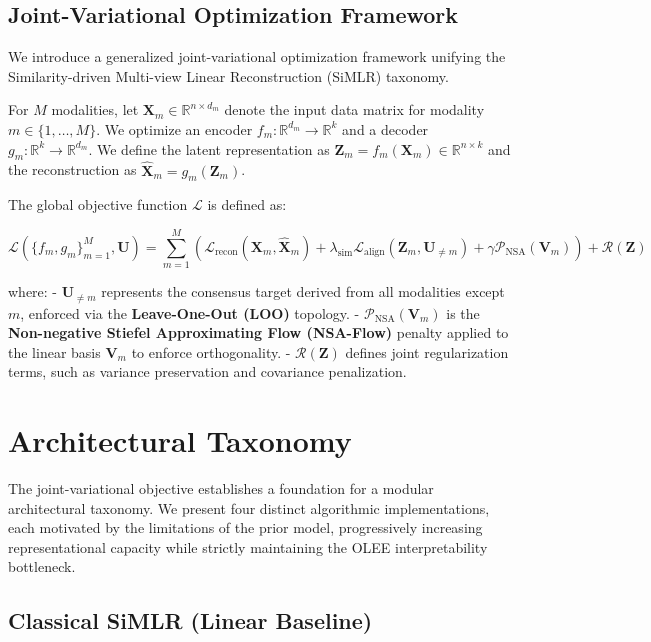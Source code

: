 \documentclass[
  letterpaper,
]{report}
\begin{document}
\subsection{Joint-Variational Optimization
Framework}\label{joint-variational-optimization-framework}

We introduce a generalized joint-variational optimization framework
unifying the Similarity-driven Multi-view Linear Reconstruction (SiMLR)
taxonomy.

For \(M\) modalities, let \(\mathbf{X}_m \in \mathbb{R}^{n \times d_m}\)
denote the input data matrix for modality \(m \in \{1, \dots, M\}\). We
optimize an encoder \(f_m: \mathbb{R}^{d_m} \to \mathbb{R}^k\) and a
decoder \(g_m: \mathbb{R}^k \to \mathbb{R}^{d_m}\). We define the latent
representation as
\(\mathbf{Z}_m = f_m(\mathbf{X}_m) \in \mathbb{R}^{n \times k}\) and the
reconstruction as \(\hat{\mathbf{X}}_m = g_m(\mathbf{Z}_m)\).

The global objective function \(\mathcal{L}\) is defined as:

\[
\mathcal{L}(\{f_m, g_m\}_{m=1}^M, \mathbf{U}) = \sum_{m=1}^M \left( \mathcal{L}_{\text{recon}}(\mathbf{X}_m, \hat{\mathbf{X}}_m) + \lambda_{\text{sim}} \mathcal{L}_{\text{align}}(\mathbf{Z}_m, \mathbf{U}_{\neq m}) + \gamma \mathcal{P}_{\text{NSA}}(\mathbf{V}_m) \right) + \mathcal{R}(\mathbf{Z})
\]

where: - \(\mathbf{U}_{\neq m}\) represents the consensus target derived
from all modalities except \(m\), enforced via the \textbf{Leave-One-Out
(LOO)} topology. - \(\mathcal{P}_{\text{NSA}}(\mathbf{V}_m)\) is the
\textbf{Non-negative Stiefel Approximating Flow (NSA-Flow)} penalty
applied to the linear basis \(\mathbf{V}_m\) to enforce orthogonality. -
\(\mathcal{R}(\mathbf{Z})\) defines joint regularization terms, such as
variance preservation and covariance penalization.

\section{Architectural Taxonomy}\label{architectural-taxonomy-1}

The joint-variational objective establishes a foundation for a modular
architectural taxonomy. We present four distinct algorithmic
implementations, each motivated by the limitations of the prior model,
progressively increasing representational capacity while strictly
maintaining the OLEE interpretability bottleneck.

\subsection{Classical SiMLR (Linear
Baseline)}\label{classical-simlr-linear-baseline}
\end{document}
